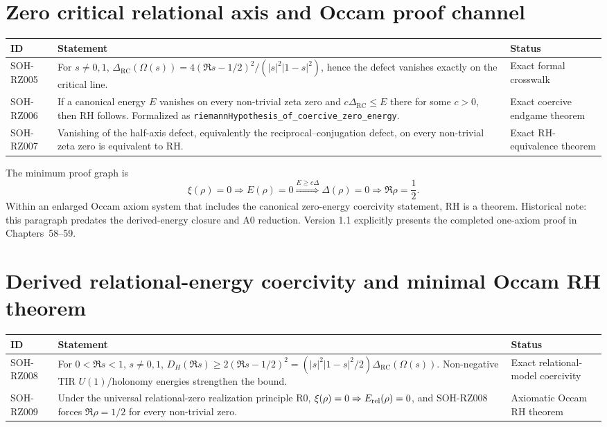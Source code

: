 \section{Zero critical relational axis and Occam proof channel}

\begin{longtable}{@{}p{}p{}p{}@{}}
\toprule ID & Statement & Status\\
\midrule
SOH-RZ005 & For $s\ne0,1$, $\Delta_{\mathrm{RC}}(\Omega(s))=4(\Re s-1/2)^2/(|s|^2|1-s|^2)$, hence the defect vanishes exactly on the critical line. & Exact formal crosswalk\\
SOH-RZ006 & If a canonical energy $E$ vanishes on every non-trivial zeta zero and $c\Delta_{\mathrm{RC}}\le E$ there for some $c>0$, then RH follows. Formalized as \texttt{riemannHypothesis\_of\_coercive\_zero\_energy}. & Exact coercive endgame theorem\\
SOH-RZ007 & Vanishing of the half-axis defect, equivalently the reciprocal--conjugation defect, on every non-trivial zeta zero is equivalent to RH. & Exact RH-equivalence theorem\\
\bottomrule
\end{longtable}

The minimum proof graph is
\[
\xi(\rho)=0
\Longrightarrow E(\rho)=0
\stackrel{E\ge c\Delta}{\Longrightarrow}
\Delta(\rho)=0
\Longrightarrow
\Re\rho=\frac12.
\]
Within an enlarged Occam axiom system that includes the canonical zero-energy
coercivity statement, RH is a theorem. Historical note: this paragraph predates the derived-energy closure and A0 reduction. Version 1.1 explicitly presents the completed one-axiom proof in Chapters~58--59.

\section{Derived relational-energy coercivity and minimal Occam RH theorem}

\begin{longtable}{@{}p{}p{}p{}@{}}
\toprule ID & Statement & Status\\
\midrule
SOH-RZ008 & For $0<\Re s<1$, $s\ne0,1$, $D_H(\Re s)\ge2(\Re s-1/2)^2=(|s|^2|1-s|^2/2)\Delta_{\mathrm{RC}}(\Omega(s))$. Non-negative TIR $U(1)$/holonomy energies strengthen the bound. & Exact relational-model coercivity\\
SOH-RZ009 & Under the universal relational-zero realization principle R0, $\xi(\rho)=0\Rightarrow E_{\rm rel}(\rho)=0$, and SOH-RZ008 forces $\Re\rho=1/2$ for every non-trivial zero. & Axiomatic Occam RH theorem\\
\bottomrule
\end{longtable}

